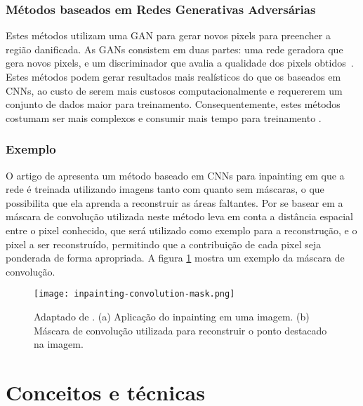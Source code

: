 \subsubsection{Métodos baseados em Redes Generativas Adversárias} \label{gan-based}
Estes métodos utilizam uma GAN para gerar novos pixels para preencher a região danificada. As GANs consistem em duas partes: uma rede geradora que gera novos pixels, e um discriminador que avalia a qualidade dos pixels obtidos~\cite{black2020evaluation}. Estes métodos podem gerar resultados mais realísticos do que os baseados em CNNs, ao custo de serem mais custosos computacionalmente e requererem um conjunto de dados maior para treinamento. Consequentemente, estes métodos costumam ser mais complexos e consumir mais tempo para treinamento \cite{pathakCVPR16context}.


\subsubsection{Exemplo}

O artigo de \cite{ren2015shepard} apresenta um método baseado em CNNs para inpainting em que a rede é treinada utilizando imagens tanto com quanto sem máscaras, o que possibilita que ela aprenda a reconstruir as áreas faltantes. Por se basear em \cite{shepard1968two} a máscara de convolução utilizada neste método leva em conta a distância espacial entre o pixel conhecido, que será utilizado como exemplo para a reconstrução, e o pixel a ser reconstruído, permitindo que a contribuição de cada pixel seja ponderada de forma apropriada. A figura \ref{fig:inpainting-convolution-mask.png} mostra um exemplo da máscara de convolução.

\begin{figure}[ht]
\centering
\texttt{[image: inpainting-convolution-mask.png]}
\caption{Adaptado de \cite{ren2015shepard}. (a) Aplicação do inpainting em uma imagem. (b) Máscara de convolução utilizada para reconstruir o ponto destacado na imagem.}
\label{fig:inpainting-convolution-mask.png}
\end{figure}





\section{Conceitos e técnicas} \label{concepts}

